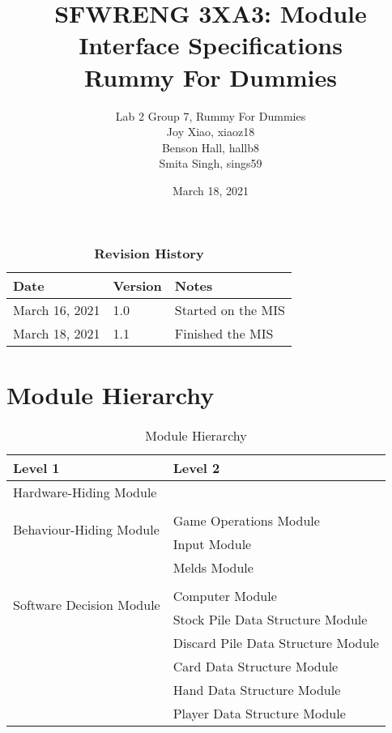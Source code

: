 \documentclass[12pt, titlepage]{article}
\title{SFWRENG 3XA3: Module Interface Specifications\\Rummy For Dummies}
\author{Lab 2 Group 7, Rummy For Dummies
		\\ Joy Xiao, xiaoz18
		\\ Benson Hall, hallb8
		\\ Smita Singh, sings59
}
\date{March 18, 2021}
\begin{document}
\maketitle

\newpage
\begin{table}[h!]
    \caption{\bf Revision History}
    \begin{tabularx}{\textwidth}{p{3cm}p{2cm}X}
        \toprule {\bf Date} & {\bf Version} & {\bf Notes}\\
        \midrule
        March 16, 2021 & 1.0 & Started on the MIS\\
        March 18, 2021 & 1.1 & Finished the MIS\\
        \bottomrule
    \end{tabularx}
\end{table}

\section{Module Hierarchy}
\begin{table}[h!]
    \centering
    \begin{tabular}{p{} p{}}
        \toprule
        \textbf{Level 1} & \textbf{Level 2}\\
        \midrule
        
        {Hardware-Hiding Module} & ~ \\
        \midrule
        
        \multirow{3}{0.3\textwidth}{Behaviour-Hiding Module}\\
        & Game Operations Module\\
        & Input Module\\
        & Melds Module\\
        \midrule
        
        \multirow{3}{0.3\textwidth}{Software Decision Module}\\
        & Computer Module\\
        & Stock Pile Data Structure Module\\
        & Discard Pile Data Structure Module\\
        & Card Data Structure Module\\
        & Hand Data Structure Module\\
        & Player Data Structure Module\\
        \bottomrule
        
    \end{tabular}
    \caption{Module Hierarchy}
    \label{TblMH}
\end{table}
\end{document}
